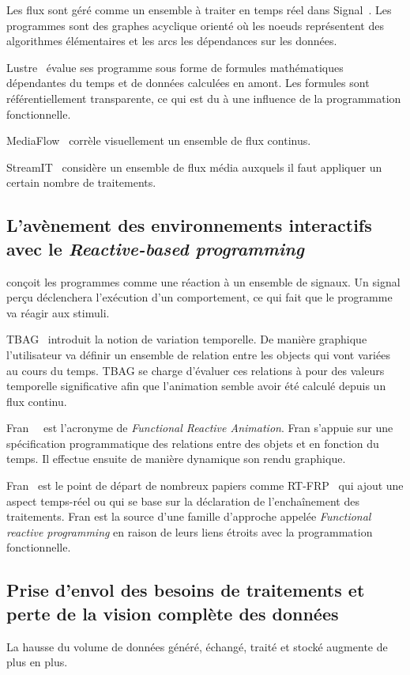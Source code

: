 \documentclass{llncs}
\newcommand{\RP}{\emph{Reactive-based programming} }
\newcommand{\FRP}{\emph{Functional reactive programming} }
\begin{document}
Les flux sont géré comme un ensemble à traiter en temps réel dans Signal~\cite{Benveniste85}.
Les programmes sont des graphes acyclique orienté où les noeuds représentent des
algorithmes élémentaires et les arcs les dépendances sur les données.

Lustre~\cite{Caspi87} évalue ses programme sous forme de formules mathématiques
dépendantes du temps et de données calculées en amont.
Les formules sont référentiellement transparente, ce qui est du à une influence
de la programmation fonctionnelle.

MediaFlow~\cite{Elliott95} corrèle visuellement un ensemble de flux continus.

StreamIT~\cite{Thies02} considère un ensemble de flux média auxquels il faut
appliquer un certain nombre de traitements.

\subsection{L'avènement des environnements interactifs avec le \RP}
\cite{Andre96} conçoit les programmes comme une réaction à un ensemble de
signaux. Un signal perçu déclenchera l'exécution d'un comportement, ce qui
fait que le programme va réagir aux stimuli.

TBAG~\cite{Elliott94} introduit la notion de variation temporelle.
De manière graphique l'utilisateur va définir un ensemble de relation
entre les objects qui vont variées au cours du temps.
TBAG se charge d'évaluer ces relations à pour des valeurs temporelle
significative afin que l'animation semble avoir été calculé depuis
un flux continu.

Fran~\cite{Elliott97}~\cite{Elliott98} est l'acronyme de \emph{Functional Reactive Animation}.
Fran s'appuie sur une spécification programmatique des relations entre des objets
et en fonction du temps.
Il effectue ensuite de manière dynamique son rendu graphique.

Fran~\cite{Elliott97} est le point de départ de nombreux papiers comme RT-FRP~\cite{Wan02}
qui ajout une aspect temps-réel ou \cite{Nilsson2002a} qui se base sur la déclaration
de l'enchaînement des traitements.
Fran est la source d'une famille d'approche appelée \FRP en raison de leurs liens
étroits avec la programmation fonctionnelle.

\subsection{Prise d'envol des besoins de traitements et perte de la vision complète des données}
La hausse du volume de données généré, échangé, traité et stocké augmente de
plus en plus.
\end{document}
